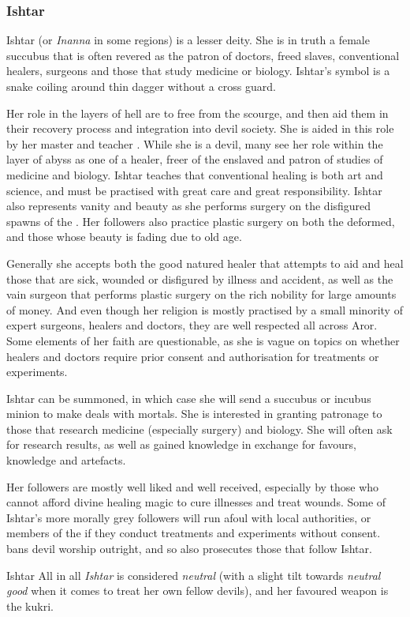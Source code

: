 \subsubsection{Ishtar}
\label{sec:Ishtar}

Ishtar (or \emph{Inanna} in some regions) is a lesser deity. She is in truth a
female succubus that is often revered as the patron of doctors, freed slaves,
conventional healers, surgeons and those that study medicine or biology.
Ishtar's symbol is a snake coiling around thin dagger without a cross guard.

Her role in the layers of hell are to free  from the
scourge, and then aid them in their recovery process and integration into
devil society. She is aided in this role by her master and teacher
. While she is a devil, many see her role within the
layer of abyss as one of a healer, freer of the enslaved and patron of studies
of medicine and biology. Ishtar teaches that conventional healing is both art
and science, and must be practised with great care and great
responsibility. Ishtar also represents vanity and beauty as she performs
surgery on the disfigured spawns of the . Her followers
also practice plastic surgery on both the deformed, and those whose beauty is
fading due to old age.

Generally she accepts both the good natured healer that attempts to aid and
heal those that are sick, wounded or disfigured by illness and accident, as
well as the vain surgeon that performs plastic surgery on the rich nobility
for large amounts of money. And even though her religion is mostly practised
by a small minority of expert surgeons, healers and doctors, they are well
respected all across Aror. Some elements of her faith are questionable, as she
is vague on topics on whether healers and doctors require prior consent and
authorisation for treatments or experiments.

Ishtar can be summoned, in which case she will send a succubus or incubus
minion to make deals with mortals. She is interested in granting patronage to
those that research medicine (especially surgery) and biology. She will often
ask for research results, as well as gained knowledge in exchange for favours,
knowledge and artefacts.

Her followers are mostly well liked and well received, especially by those who
cannot afford divine healing magic to cure illnesses and treat wounds. Some of
Ishtar's more morally grey followers will run afoul with local authorities, or
members of the  if they conduct treatments and experiments
without consent.  bans devil worship outright, and so also
prosecutes those that follow Ishtar.

\begin{35e}{Ishtar}
  All in all \emph{Ishtar} is considered \emph{neutral} (with a slight tilt
  towards \emph{neutral good} when it comes to treat her own fellow devils),
  and her favoured weapon is the kukri.
\end{35e}
